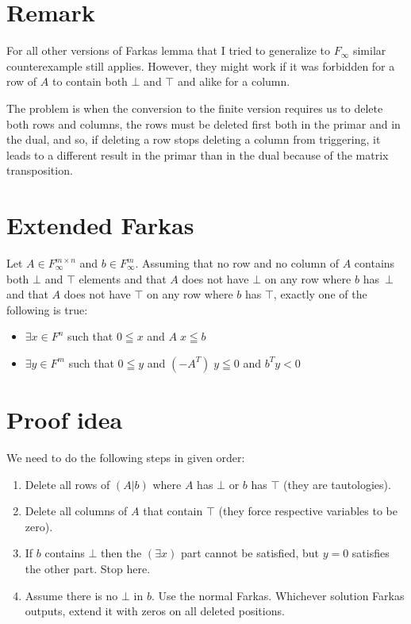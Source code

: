 \documentclass[]{article}
\begin{document}
\section{Remark}

For all other versions of Farkas lemma
that I tried to generalize to $F_\infty$
similar counterexample still applies.
However, they might work if it was forbidden
for a row of $A$ to contain both $\bot$ and $\top$
and alike for a column.

The problem is when the conversion to the finite
version requires us to delete both rows and columns,
the rows must be deleted first both in the primar
and in the dual, and so, if deleting a row stops
deleting a column from triggering, it leads to a
different result in the primar than in the dual
because of the matrix transposition.

\section{Extended Farkas}

Let $A \in F_\infty^{m \times n}$ and $b \in F_\infty^m$.
Assuming that no row and no column of $A$ contains
both $\bot$ and $\top$ elements and that
$A$ does not have $\bot$ on any row where $b$ has~$\bot$
and that
$A$ does not have $\top$ on any row where $b$ has $\top$,
exactly one of the following is true:
\begin{itemize}
	\item $\exists x \in F^n$ such that
	$0 \leqq x$ and $A\; x \leqq b$
	\item $\exists y \in F^m$ such that
	$0 \leqq y$ and $(-A^T)\; y \leqq 0$ and $b^T y < 0$
\end{itemize}

\section{Proof idea}

We need to do the following steps in given order:
\begin{enumerate}
\item Delete all rows of $(A|b)$ where $A$ has $\bot$ or $b$ has $\top$
(they are tautologies).
\item Delete all columns of $A$ that contain $\top$
(they force respective variables to be zero).
\item If $b$ contains $\bot$ then the $(\exists x)$ part cannot be satisfied,
but $y = 0$ satisfies the other part. Stop here.
\item Assume there is no $\bot$ in $b$. Use the normal Farkas.
Whichever solution Farkas outputs, extend it with zeros on
all deleted positions.
\end{enumerate}
\end{document}
